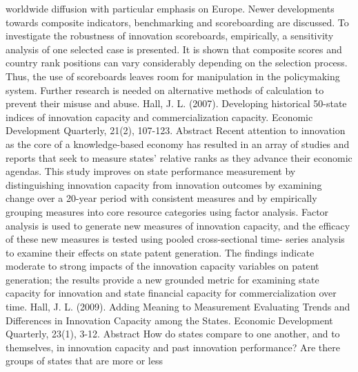 \documentclass[a4paper,11pt]{article}
\begin{document}
worldwide diffusion with particular emphasis on Europe. Newer developments towards composite indicators, benchmarking and scoreboarding are discussed. To investigate the robustness of innovation scoreboards, empirically, a sensitivity analysis of one selected case is presented. It is shown that composite scores and country rank positions can vary considerably depending on the selection process. Thus, the use of scoreboards leaves room for manipulation in the policymaking system. Further research is needed on alternative methods of calculation to prevent their misuse and abuse.
Hall, J. L. (2007). Developing historical 50-state indices of innovation capacity and commercialization capacity. Economic Development Quarterly, 21(2), 107-123.
Abstract
Recent attention to innovation as the core of a knowledge-based economy has resulted in an array of studies and reports that seek to measure states' relative ranks as they advance their economic agendas. This study improves on state performance measurement by distinguishing innovation capacity from innovation outcomes by examining change over a 20-year period with consistent measures and by empirically grouping measures into core resource categories using factor analysis. Factor analysis is used to generate new measures of innovation capacity, and the efficacy of these new measures is tested using pooled cross-sectional time- series analysis to examine their effects on state patent generation. The findings indicate moderate to strong impacts of the innovation capacity variables on patent generation; the results provide a new grounded metric for examining state capacity for innovation and state financial capacity for commercialization over time.
Hall, J. L. (2009). Adding Meaning to Measurement Evaluating Trends and Differences in Innovation Capacity among the States. Economic Development Quarterly, 23(1), 3-12.
Abstract
How do states compare to one another, and to themselves, in innovation capacity and past innovation performance? Are there groups of states that are more or less
 
\end{document}
